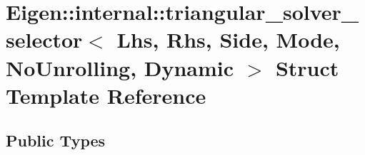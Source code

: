 \hypertarget{struct_eigen_1_1internal_1_1triangular__solver__selector_3_01_lhs_00_01_rhs_00_01_side_00_01_mod9d4c365fbf3ecd733e3c477f950cfbe8}{}\section{Eigen\+:\+:internal\+:\+:triangular\+\_\+solver\+\_\+selector$<$ Lhs, Rhs, Side, Mode, No\+Unrolling, Dynamic $>$ Struct Template Reference}
\label{struct_eigen_1_1internal_1_1triangular__solver__selector_3_01_lhs_00_01_rhs_00_01_side_00_01_mod9d4c365fbf3ecd733e3c477f950cfbe8}
\subsection*{Public Types}
